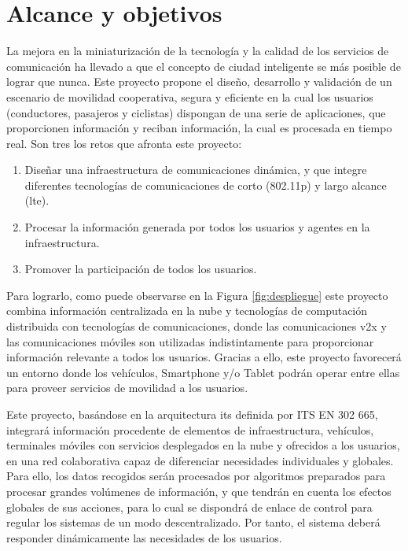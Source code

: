 \chapter{Alcance y objetivos}\label{cha:alcance}
La mejora en la miniaturización de la tecnología y la calidad de los servicios
de comunicación ha llevado a que el concepto de ciudad inteligente se más
posible de lograr que nunca. Este proyecto propone el diseño, desarrollo y
validación de un escenario de movilidad cooperativa, segura y eficiente en la
cual los usuarios (conductores, pasajeros y ciclistas) dispongan de una serie
de aplicaciones, que proporcionen información y reciban información, la cual es
procesada en tiempo real. Son tres los retos que afronta este proyecto:

\begin{enumerate}
	\item Diseñar una infraestructura de comunicaciones dinámica, y que integre
	diferentes tecnologías de comunicaciones de corto (\Gls{802.11p}) y largo
	alcance (\gls{lte}).

	\item Procesar la información generada por todos los usuarios y agentes en la
	infraestructura.

	\item Promover la participación de todos los usuarios.

\end{enumerate}
Para lograrlo, como puede observarse en la Figura \ref{fig:despliegue} este
proyecto combina información centralizada en la nube y tecnologías de
computación distribuida con tecnologías de comunicaciones, donde las
comunicaciones \gls{v2x} y las comunicaciones móviles son utilizadas
indistintamente para proporcionar información relevante a todos los usuarios.
Gracias a ello, este proyecto favorecerá un entorno donde los vehículos,
Smartphone y/o Tablet podrán operar entre ellas para proveer servicios de
movilidad a los usuarios.

Este proyecto, basándose en la arquitectura \gls{its} definida por ITS EN 302
665, integrará información procedente de elementos de infraestructura,
vehículos, terminales móviles con servicios desplegados en la nube y ofrecidos
a los usuarios, en una red colaborativa capaz de diferenciar necesidades
individuales y globales. Para ello, los datos recogidos serán procesados por
algoritmos preparados para procesar grandes volúmenes de información, y que
tendrán en cuenta los efectos globales de sus acciones, para lo cual se
dispondrá de enlace de control para regular los sistemas de un modo
descentralizado. Por tanto, el sistema deberá responder dinámicamente las
necesidades de los usuarios.

